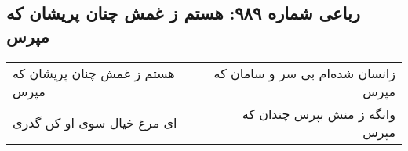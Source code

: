 \begin{center}
\section*{رباعی شماره ۹۸۹: هستم ز غمش چنان پریشان که مپرس}
\label{sec:0989}
\begin{longtable}{l p{0.5cm} r}
هستم ز غمش چنان پریشان که مپرس
&&
زانسان شده‌ام بی سر و سامان که مپرس
\\
ای مرغ خیال سوی او کن گذری
&&
وانگه ز منش بپرس چندان که مپرس
\\
\end{longtable}
\end{center}
